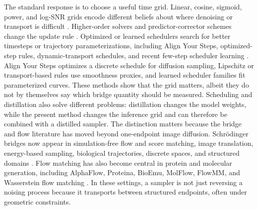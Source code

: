 \documentclass{article}
\theoremstyle{plain}
\theoremstyle{definition}
\theoremstyle{remark}
\begin{document}
The standard response is to choose a useful time grid. Linear, cosine, sigmoid, power, and log-SNR grids encode different beliefs about where denoising or transport is difficult \citep{nichol2021improved,kingma2021vdm,karras2022edm,lin2024common}. Higher-order solvers and predictor-corrector schemes change the update rule \citep{lu2022dpm,lu2022dpmsolverpp,zhao2023unipc,zhang2022deis,tan2026stork}. Optimized or learned schedulers search for better timesteps or trajectory parameterizations, including Align Your Steps, optimized-step rules, dynamic-transport schedules, and recent few-step scheduler learning \citep{sabour2024alignsteps,xue2024optimized,tsimpos2025lipschitz,min2026bezierflow}. Align Your Steps optimizes a discrete schedule for diffusion sampling, Lipschitz or transport-based rules use smoothness proxies, and learned scheduler families fit parameterized curves. These methods show that the grid matters, albeit they do not by themselves say which bridge quantity should be measured. Scheduling and distillation also solve different problems: distillation changes the model weights, while the present method changes the inference grid and can therefore be combined with a distilled sampler. The distinction matters because the bridge and flow literature has moved beyond one-endpoint image diffusion. Schr\"odinger bridges now appear in simulation-free flow and score matching, image translation, energy-based sampling, biological trajectories, discrete spaces, and structured domains \citep{tong2024simulation,liu2023i2sb,liu2025asbs,tamogashev2026dataenergy,ksenofontov2025categorical,tang2026branched,wyrwal2026topological}. Flow matching has also become central in protein and molecular generation, including AlphaFlow, Proteina, BioEmu, MolFlow, FlowMM, and Wasserstein flow matching \citep{jing2024alphafoldmeetsflowmatching,proteina2025,bioemu2024,irwin2024molflow,miller2024flowmm,haviv2025wasserstein}. In these settings, a sampler is not just reversing a noising process because it transports between structured endpoints, often under geometric constraints.
\end{document}
